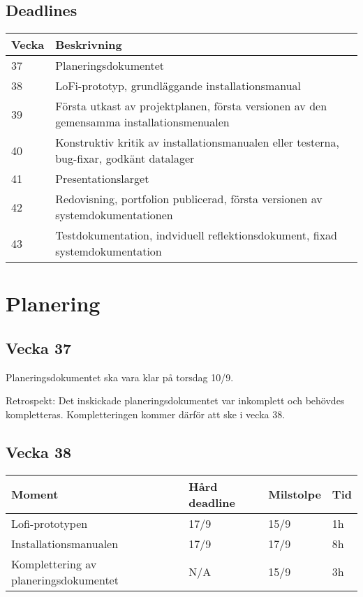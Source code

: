\documentclass{TDP003mall}
\begin{document}
\subsection{Deadlines}
\begin{table}[!h]
\begin{tabularx}{\linewidth}{|l|X|}
\hline
Vecka & Beskrivning \\\hline
37 & Planeringsdokumentet \\\hline
38 & LoFi-prototyp, grundläggande installationsmanual \\\hline
39 & Första utkast av projektplanen, första versionen av den gemensamma installationsmenualen \\\hline
40 & Konstruktiv kritik av installationsmanualen eller testerna, bug-fixar, godkänt datalager \\\hline
41 & Presentationslarget \\\hline
42 & Redovisning, portfolion publicerad, första versionen av systemdokumentationen \\\hline
43 & Testdokumentation, indviduell reflektionsdokument, fixad systemdokumentation \\\hline
\end{tabularx}
\end{table}

\newpage

\section{Planering}
\subsection*{Vecka 37}
Planeringsdokumentet ska vara klar på torsdag 10/9.

Retrospekt: Det inskickade planeringsdokumentet var inkomplett och behövdes kompletteras. Kompletteringen kommer därför att ske i vecka 38.

\subsection*{Vecka 38}
\begin{table}[!h]
\begin{tabularx}{\linewidth}{|X|l|l|l|}
\hline
Moment & Hård deadline & Milstolpe & Tid \\\hline
Lofi-prototypen & 17/9 & 15/9 & 1h \\\hline
Installationsmanualen & 17/9 & 17/9 & 8h \\\hline
Komplettering av planeringsdokumentet & N/A & 15/9 & 3h\\\hline
\end{tabularx}
\end{table}
\end{document}

